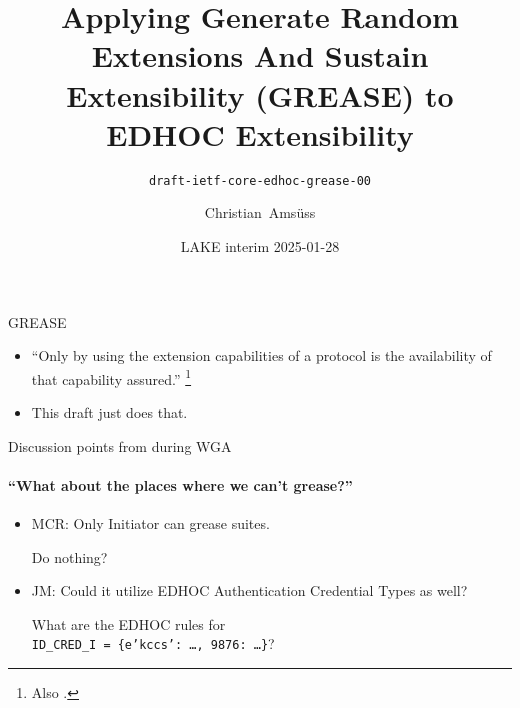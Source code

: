 

\title[Applying GREASE to EDHOC]{Applying Generate Random Extensions And Sustain Extensibility (GREASE) to EDHOC Extensibility}
\subtitle{\texttt{draft-ietf-core-edhoc-grease-00}}
\author{Christian~Amsüss}
\date{LAKE interim 2025-01-28}



\frame{\titlepage}

\begin{frame}{GREASE}\Large
  \begin{itemize}
    \item ``Only by using the extension capabilities of a protocol is the availability of that capability assured.'' \footnote{Also .}
    \item This draft just does that.
  \end{itemize}
\end{frame}

\begin{frame}{Discussion points from during WGA}\framesubtitle{``What about the places where we can't grease?''}\Large
  \begin{itemize}
    \item MCR: Only Initiator can grease suites.

      \bigskip

      Do nothing? %

      \bigskip

    \item JM: Could it utilize EDHOC Authentication Credential Types as well?

      \bigskip

      What are the EDHOC rules for \\\texttt{ID\_CRED\_I = \{e'kccs': …, 9876: …\}}?

  \end{itemize}
\end{frame}


